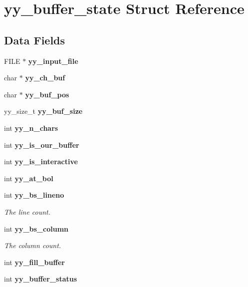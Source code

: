\section{yy\-\_\-buffer\-\_\-state Struct Reference}
\label{structyy__buffer__state}
\subsection*{Data Fields}
\begin{DoxyCompactItemize}
\item 
F\-I\-L\-E $\ast$ {\bfseries yy\-\_\-input\-\_\-file}\label{structyy__buffer__state_a4360acfb226a1fc240ab2be17dd6beda}

\item 
char $\ast$ {\bfseries yy\-\_\-ch\-\_\-buf}\label{structyy__buffer__state_a0d25458e69eb22207fc633a1255d099d}

\item 
char $\ast$ {\bfseries yy\-\_\-buf\-\_\-pos}\label{structyy__buffer__state_a8435c3f786bbb55d21d0174e4cfc22a0}

\item 
yy\-\_\-size\-\_\-t {\bfseries yy\-\_\-buf\-\_\-size}\label{structyy__buffer__state_a48302f5f3477a9c78bbddf56d356ef54}

\item 
int {\bfseries yy\-\_\-n\-\_\-chars}\label{structyy__buffer__state_a06406208824817acfec2183b79080945}

\item 
int {\bfseries yy\-\_\-is\-\_\-our\-\_\-buffer}\label{structyy__buffer__state_a80ce2431c70dc4f89ced487f18449465}

\item 
int {\bfseries yy\-\_\-is\-\_\-interactive}\label{structyy__buffer__state_abf5c70eea75581b58c0ee7bd31b14490}

\item 
int {\bfseries yy\-\_\-at\-\_\-bol}\label{structyy__buffer__state_a9d60c60af6e1a6f69de16871fd64f85f}

\item 
int {\bf yy\-\_\-bs\-\_\-lineno}
\begin{DoxyCompactList}\small\item\em The line count. \end{DoxyCompactList}\item 
int {\bf yy\-\_\-bs\-\_\-column}
\begin{DoxyCompactList}\small\item\em The column count. \end{DoxyCompactList}\item 
int {\bfseries yy\-\_\-fill\-\_\-buffer}\label{structyy__buffer__state_a63d2afbb1d79a3fc63df9e12626f827d}

\item 
int {\bfseries yy\-\_\-buffer\-\_\-status}\label{structyy__buffer__state_a70fd925d37a2f0454fbd0def675d106c}

\end{DoxyCompactItemize}


